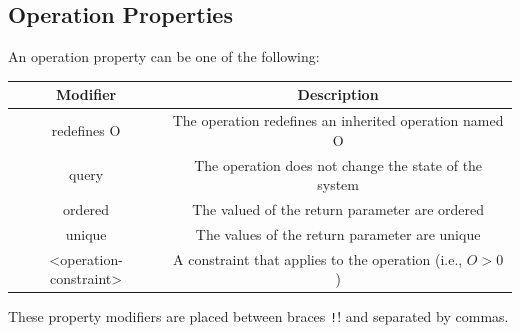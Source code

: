 \documentclass{article}
\begin{document}
\subsection{Operation Properties}
An operation property can be one of the following:
\begin{table}[H]
    \centering
    \begin{tabular}{c c}
        \toprule
        \textbf{Modifier}      & \textbf{Description}                                       \\
        \midrule
        redefines O            & The operation redefines an inherited operation named O     \\
        query                  & The operation does not change the state of the system      \\
        ordered                & The valued of the return parameter are ordered             \\
        unique                 & The values of the return parameter are unique              \\
        <operation-constraint> & A constraint that applies to the operation (i.e., \(O>0\)) \\
        \bottomrule
    \end{tabular}
\end{table}
These property modifiers are placed between braces \texttt!{}! and separated by commas.
\end{document}
